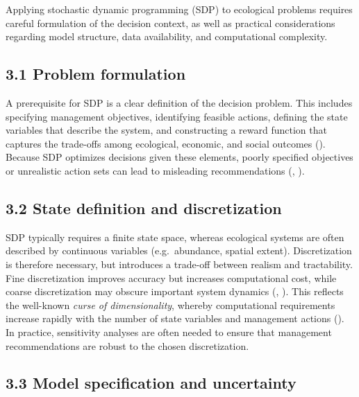 \documentclass[
  11pt,
  a4paper,
]{article}
\begin{document}
Applying stochastic dynamic programming (SDP) to ecological problems requires careful formulation of the decision context, as well as practical considerations regarding model structure, data availability, and computational complexity.

\subsection{3.1 Problem formulation}\label{problem-formulation}

A prerequisite for SDP is a clear definition of the decision problem. This includes specifying management objectives, identifying feasible actions, defining the state variables that describe the system, and constructing a reward function that captures the trade-offs among ecological, economic, and social outcomes (). Because SDP optimizes decisions given these elements, poorly specified objectives or unrealistic action sets can lead to misleading recommendations (, ).

\subsection{3.2 State definition and discretization}\label{state-definition-and-discretization}

SDP typically requires a finite state space, whereas ecological systems are often described by continuous variables (e.g.~abundance, spatial extent). Discretization is therefore necessary, but introduces a trade-off between realism and tractability. Fine discretization improves accuracy but increases computational cost, while coarse discretization may obscure important system dynamics (, ). This reflects the well-known \emph{curse of dimensionality}, whereby computational requirements increase rapidly with the number of state variables and management actions (). In practice, sensitivity analyses are often needed to ensure that management recommendations are robust to the chosen discretization.

\subsection{3.3 Model specification and uncertainty}\label{model-specification-and-uncertainty}
\end{document}
